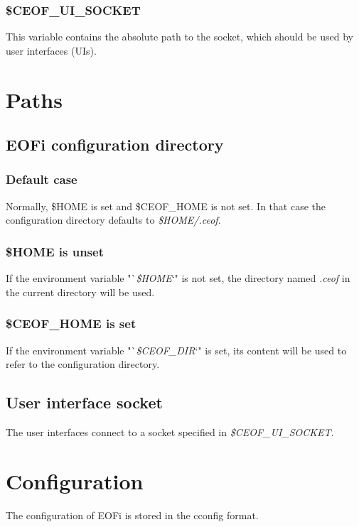 \documentclass[12pt,a4paper]{book}
\begin{document}
\subsubsection{\$CEOF\_UI\_SOCKET}
This variable contains the absolute path to the socket, which should be used
by user interfaces (UIs).
\section{Paths}
\subsection{EOFi configuration directory}
\subsubsection{Default case}
Normally, \$HOME is set and \$CEOF\_HOME is not set. In that case
the configuration directory defaults to \textit{\$HOME/.ceof}.
\subsubsection{\$HOME is unset}
If the environment variable "`\textit{\$HOME}`" is not set,
the directory named \textit{.ceof} in the current directory will be used.
\subsubsection{\$CEOF\_HOME is set}
If the environment variable "`\textit{\$CEOF\_DIR}`" is set,
its content will be used to refer to the configuration directory.
\subsection{User interface socket}
The user interfaces connect to a socket specified in
\textit{\$CEOF\_UI\_SOCKET}.
\section{Configuration}
The configuration of EOFi is stored in the cconfig\cite{cconfig} format.
\end{document}
